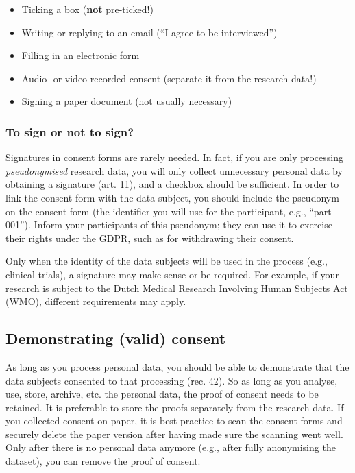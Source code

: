 \documentclass[
]{book}
\providecommand{\tightlist}{%
  \setlength{\itemsep}{0pt}\setlength{\parskip}{0pt}}
\begin{document}
\begin{itemize}
\tightlist
\item
  Ticking a box (\textbf{not} pre-ticked!)
\item
  Writing or replying to an email (``I agree to be interviewed'')
\item
  Filling in an electronic form
\item
  Audio- or video-recorded consent (separate it from the research data!)
\item
  Signing a paper document (not usually necessary)
\end{itemize}

\hypertarget{to-sign-or-not-to-sign}{%
\subsubsection{To sign or not to sign?}\label{to-sign-or-not-to-sign}}

Signatures in consent forms are rarely needed. In fact, if you are only
processing \emph{pseudonymised} research data, you will only collect unnecessary
personal data by obtaining a signature
(art. 11), and a
checkbox should be sufficient. In order to link the consent form with the data
subject, you should include the pseudonym on the consent form (the identifier
you will use for the participant, e.g., ``part-001''). Inform your participants
of this pseudonym; they can use it to exercise their rights under the GDPR,
such as for withdrawing their consent.

Only when the identity of the data subjects will be used in the process (e.g.,
clinical trials), a signature may make sense or be required. For example, if
your research is subject
to the Dutch Medical Research Involving Human Subjects Act (WMO),
different requirements may apply.

\hypertarget{demonstrate-consent}{%
\subsection{Demonstrating (valid) consent}\label{demonstrate-consent}}

As long as you process personal data, you should be able to demonstrate that the
data subjects consented to that processing
(rec. 42).
So as long as you analyse, use, store, archive, etc. the personal data, the
proof of consent needs to be retained. It is preferable to store the proofs
separately from the research data. If you collected consent on paper, it is
best practice to scan the consent forms and securely delete the paper version
after having made sure the scanning went well. Only after there is no personal
data anymore (e.g., after fully anonymising the dataset), you can remove the
proof of consent.
\end{document}
